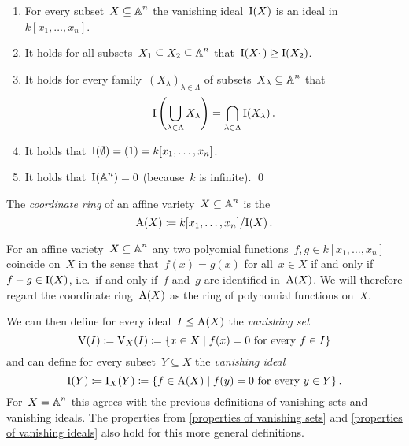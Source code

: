 \begin{lemma}
  \label{properties of vanishing ideals}
  \leavevmode
  \begin{enumerate}
    \item
      For every subset~$X \subseteq \operatorname{\mathbb{A}}^n$ the vanishing ideal~$\operatorname{I}(X)$ is an ideal in~$k[x_1, \dotsc, x_n]$.
    \item
      It holds for all subsets~$X_1 \subseteq X_2 \subseteq \operatorname{\mathbb{A}}^n$ that~$\operatorname{I}(X_1) \trianglerighteq \operatorname{I}(X_2)$.
    \item
      It holds for every family~$(X_\lambda)_{\lambda \in \Lambda}$ of subsets~$X_\lambda \subseteq \operatorname{\mathbb{A}}^n$ that
      \[
          \operatorname{I}\left( \bigcup_{\lambda \in \Lambda} X_\lambda \right)
        = \bigcap_{\lambda \in \Lambda} \operatorname{I}(X_\lambda) \,.
      \]
    \item
      It holds that~$\operatorname{I}(\emptyset) = (1) = k[x_1, \dotsc, x_n]$.
    \item
      It holds that~$\operatorname{I}(\operatorname{\mathbb{A}}^n) = 0$ (because~$k$ is infinite).
    \qed
  \end{enumerate}
\end{lemma}


\begin{definition}
  The \emph{coordinate ring} of an affine variety~$X \subseteq \operatorname{\mathbb{A}}^n$ is the~
  \[
              \operatorname{A}(X)
    \coloneqq  k[x_1, \dotsc, x_n]/{\operatorname{I}(X)} \,.
  \]
\end{definition}


\begin{fluff}
  For an affine variety~$X \subseteq \operatorname{\mathbb{A}}^n$ any two polyomial functions~$f, g \in k[x_1, \dotsc, x_n]$ coincide on~$X$ in the sense that~$f(x) = g(x)$ for all~$x \in X$ if and only if~$f - g \in \operatorname{I}(X)$, i.e.\ if and only if~$f$ and~$g$ are identified in~$\operatorname{A}(X)$.
  We will therefore regard the coordinate ring~$\operatorname{A}(X)$ as the ring of polynomial functions on~$X$.
  
  We can then define for every ideal~$I \trianglelefteq \operatorname{A}(X)$ the \emph{vanishing set}
  \[
              \vset(I)
    \defined  \vset_X(I)
    \defined  \{
                x \in X
              \suchthat
                \text{$f(x) = 0$ for every~$f \in I$}
              \}
  \]
  and can define for every subset~$Y \subseteq X$ the \emph{vanishing ideal}
  \[
              \videal(Y)
    \defined  \videal_X(Y)
    \defined  \{
                f \in \coord(X)
              \suchthat
                \text{$f(y) = 0$ for every~$y \in Y$}
              \} \,.
  \]
  For~$X = \operatorname{\mathbb{A}}^n$ this agrees with the previous definitions of vanishing sets and vanishing ideals.
  The properties from \cref{properties of vanishing sets} and \cref{properties of vanishing ideals} also hold for this more general definitions.
\end{fluff}


